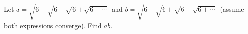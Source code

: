 Let $a=\sqrt{6+\sqrt{6-\sqrt{6+\sqrt{6-\cdots}}}}$ and $b=\sqrt{6-\sqrt{6+\sqrt{6-\sqrt{6+\cdots}}}}$ (assume both expressions converge). Find $ab$.
